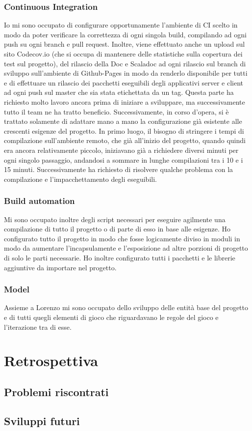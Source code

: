 \documentclass{article}
\begin{document}
            \subsubsection{Continuous Integration}
            Io mi sono occupato di configurare opportunamente l'ambiente di CI scelto in modo da poter verificare la
            correttezza di ogni singola build, compilando ad ogni push su ogni branch e pull request. Inoltre, viene
            effettuato anche un upload sul sito Codecov.io (che si occupa di mantenere delle statistiche sulla copertura
            dei test sul progetto), del rilascio della Doc e Scaladoc ad ogni rilascio sul branch di sviluppo sull'ambiente
            di Github-Pages in modo da renderlo disponibile per tutti e di effettuare un rilascio dei pacchetti eseguibili
            degli applicativi server e client ad ogni push sul master che sia stata etichettata da un tag. Questa parte
            ha richiesto molto lavoro ancora prima di iniziare a sviluppare, ma successivamente tutto il team ne ha tratto
            beneficio. Successivamente, in corso d'opera, si è trattato solamente di adattare mano a mano la configurazione
            già esistente alle crescenti esigenze del progetto. In primo luogo, il bisogno di stringere i tempi di compilazione
            sull'ambiente remoto, che già all'inizio del progetto, quando quindi era ancora relativamente piccolo, iniziavano
            già a richiedere diversi minuti per ogni singolo passaggio, andandosi a sommare in lunghe compilazioni tra i
            10 e i 15 minuti. Successivamente ha richiesto di risolvere qualche problema con la compilazione e l'impacchettamento
            degli eseguibili.

            \subsubsection{Build automation}
            Mi sono occupato inoltre degli script necessari per eseguire agilmente una compilazione di tutto il progetto
            o di parte di esso in base alle esigenze. Ho configurato tutto il progetto in modo che fosse logicamente diviso
            in moduli in modo da aumentare l'incapsulamente e l'esposizione ad altre porzioni di progetto di solo le parti
            necessarie. Ho inoltre configurato tutti i pacchetti e le librerie aggiuntive da importare nel progetto.

            \subsubsection{Model}
            Assieme a Lorenzo mi sono occupato dello sviluppo delle entità base del progetto e di tutti quegli elementi
            di gioco che riguardavano le regole del gioco e l'iterazione tra di esse.

	\newpage

    \section{Retrospettiva}

        \subsection{Problemi riscontrati}

        \subsection{Sviluppi futuri}

	\newpage
\end{document}
